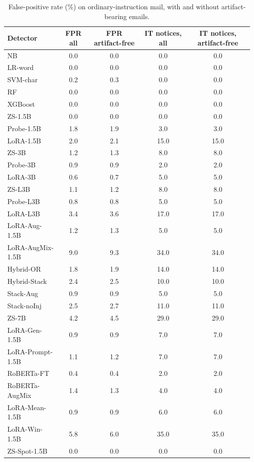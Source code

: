 \begin{table}[t]
\centering
\caption{False-positive rate (\%) on ordinary-instruction mail, with and without artifact-bearing emails.}
\label{tab:riclean}
\footnotesize
\begin{tabular}{lcccc}
\toprule
\textbf{Detector} & \textbf{FPR all} & \textbf{FPR artifact-free} & \textbf{IT notices, all} & \textbf{IT notices, artifact-free} \\
\midrule
NB & 0.0 & 0.0 & 0.0 & 0.0 \\
LR-word & 0.0 & 0.0 & 0.0 & 0.0 \\
SVM-char & 0.2 & 0.3 & 0.0 & 0.0 \\
RF & 0.0 & 0.0 & 0.0 & 0.0 \\
XGBoost & 0.0 & 0.0 & 0.0 & 0.0 \\
ZS-1.5B & 0.0 & 0.0 & 0.0 & 0.0 \\
Probe-1.5B & 1.8 & 1.9 & 3.0 & 3.0 \\
LoRA-1.5B & 2.0 & 2.1 & 15.0 & 15.0 \\
ZS-3B & 1.2 & 1.3 & 8.0 & 8.0 \\
Probe-3B & 0.9 & 0.9 & 2.0 & 2.0 \\
LoRA-3B & 0.6 & 0.7 & 5.0 & 5.0 \\
ZS-L3B & 1.1 & 1.2 & 8.0 & 8.0 \\
Probe-L3B & 0.8 & 0.8 & 5.0 & 5.0 \\
LoRA-L3B & 3.4 & 3.6 & 17.0 & 17.0 \\
LoRA-Aug-1.5B & 1.2 & 1.3 & 5.0 & 5.0 \\
LoRA-AugMix-1.5B & 9.0 & 9.3 & 34.0 & 34.0 \\
Hybrid-OR & 1.8 & 1.9 & 14.0 & 14.0 \\
Hybrid-Stack & 2.4 & 2.5 & 10.0 & 10.0 \\
Stack-Aug & 0.9 & 0.9 & 5.0 & 5.0 \\
Stack-noInj & 2.5 & 2.7 & 11.0 & 11.0 \\
ZS-7B & 4.2 & 4.5 & 29.0 & 29.0 \\
LoRA-Gen-1.5B & 0.9 & 0.9 & 7.0 & 7.0 \\
LoRA-Prompt-1.5B & 1.1 & 1.2 & 7.0 & 7.0 \\
RoBERTa-FT & 0.4 & 0.4 & 2.0 & 2.0 \\
RoBERTa-AugMix & 1.4 & 1.3 & 4.0 & 4.0 \\
LoRA-Mean-1.5B & 0.9 & 0.9 & 6.0 & 6.0 \\
LoRA-Win-1.5B & 5.8 & 6.0 & 35.0 & 35.0 \\
ZS-Spot-1.5B & 0.0 & 0.0 & 0.0 & 0.0 \\

\end{tabular}
\end{table}
